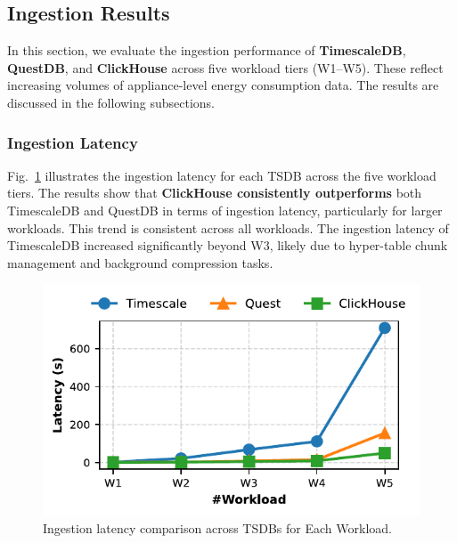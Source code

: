 \documentclass[conference]{IEEEtran}
\begin{document}
\subsection{Ingestion Results}
In this section, we evaluate the ingestion performance of \textbf{TimescaleDB}, \textbf{QuestDB}, and \textbf{ClickHouse} across five workload tiers (W1--W5). These reflect increasing volumes of appliance-level energy consumption data. The results are discussed in the following subsections.

\subsubsection{Ingestion Latency}
Fig.~\ref{fig:ingestion_latency_comparison} illustrates the ingestion latency for each TSDB across the five workload tiers. The results show that \textbf{ClickHouse consistently outperforms} both TimescaleDB and QuestDB in terms of ingestion latency, particularly for larger workloads. This trend is consistent across all workloads. The ingestion latency of TimescaleDB increased significantly beyond W3, likely due to hyper-table chunk management and background compression tasks.
\begin{figure}[tb]
\centering
\includegraphics[width=1.0\linewidth]{1_ing_latency_plot.pdf}
\caption{Ingestion latency comparison across TSDBs for Each Workload.}
\label{fig:ingestion_latency_comparison}
\end{figure}
\end{document}
